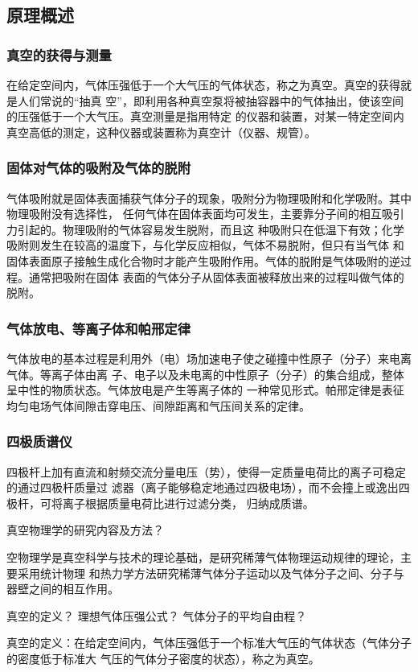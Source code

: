 \documentclass[dvipsnames, svgnames,a4paper,11pt]{article}
\begin{document}
\subsection{原理概述}
\subsubsection{真空的获得与测量}
在给定空间内，气体压强低于一个大气压的气体状态，称之为真空。真空的获得就是人们常说的“抽真
空”，即利用各种真空泵将被抽容器中的气体抽出，使该空间的压强低于一个大气压。真空测量是指用特定
的仪器和装置，对某一特定空间内真空高低的测定，这种仪器或装置称为真空计（仪器、规管）。
\subsubsection{固体对气体的吸附及气体的脱附}
气体吸附就是固体表面捕获气体分子的现象，吸附分为物理吸附和化学吸附。其中物理吸附没有选择性，
任何气体在固体表面均可发生，主要靠分子间的相互吸引力引起的。物理吸附的气体容易发生脱附，而且这
种吸附只在低温下有效；化学吸附则发生在较高的温度下，与化学反应相似，气体不易脱附，但只有当气体
和固体表面原子接触生成化合物时才能产生吸附作用。气体的脱附是气体吸附的逆过程。通常把吸附在固体
表面的气体分子从固体表面被释放出来的过程叫做气体的脱附。
\subsubsection{气体放电、等离子体和帕邢定律}
气体放电的基本过程是利用外（电）场加速电子使之碰撞中性原子（分子）来电离气体。等离子体由离
子、电子以及未电离的中性原子（分子）的集合组成，整体呈中性的物质状态。气体放电是产生等离子体的
一种常见形式。帕邢定律是表征均匀电场气体间隙击穿电压、间隙距离和气压间关系的定律。
\subsubsection{四极质谱仪}
四极杆上加有直流和射频交流分量电压（势），使得一定质量电荷比的离子可稳定的通过四极杆质量过
滤器（离子能够稳定地通过四极电场），而不会撞上或逸出四极杆，可将离子根据质量电荷比进行过滤分类，
归纳成质谱。
\begin{question}
	真空物理学的研究内容及方法？
\end{question}
空物理学是真空科学与技术的理论基础，是研究稀薄气体物理运动规律的理论，主要采用统计物理
和热力学方法研究稀薄气体分子运动以及气体分子之间、分子与器壁之间的相互作用。
\begin{question}
	真空的定义？ 理想气体压强公式？ 气体分子的平均自由程？
\end{question}
真空的定义：在给定空间内，气体压强低于一个标准大气压的气体状态（气体分子的密度低于标准大
气压的气体分子密度的状态），称之为真空。
\end{document}
